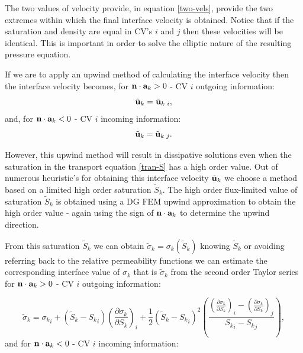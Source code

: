 The two values of velocity provide, in equation \ref{two-vels}, provide the two extremes within which the final interface 
velocity is obtained. Notice that if the saturation and density are equal in 
CV's $i$ and $j$ then these velocities will be identical. This is important in order to 
solve the elliptic nature of the resulting pressure equation. 

If we are to apply an upwind method of calculating the interface velocity then 
the interface velocity becomes, for ${\bf n}\cdot {\bf a}_k>0$ - CV $i$ outgoing information:
\begin{equation}
{\tilde{\bf u}}_k = {\tilde{\bf u}}_k\:_i ,
\end{equation} 
and, for ${\bf n}\cdot {\bf a}_k<0$ - CV $i$ incoming information:
\begin{equation}
{\tilde{\bf u}}_k = {\tilde{\bf u}}_k\:_j. 
\end{equation} 

However, this upwind method will result in dissipative solutions even when the saturation in the transport equation \ref{tran-S}
has a high order value. 
Out of numerous heuristic's for obtaining this interface velocity ${\tilde{\bf u}}_k$ we choose 
a method based on a limited high order saturation $\tilde S_k$.  
The high order flux-limited value of saturation $\tilde S_k$ is obtained using a DG FEM upwind approximation to 
obtain the high order value - again using the 
sign of ${\bf n}\cdot {\bf a}_k$ to determine the upwind direction. 

From this saturation $\tilde S_k$ we can obtain 
$\tilde\sigma_k = \sigma_k (\tilde S_k)$ knowing $\tilde S_k$ or avoiding referring back to the relative 
permeability functions 
we can estimate the corresponding interface value of $\sigma_k$ that is 
$\tilde\sigma_k$ from the second order Taylor series for ${\bf n}\cdot {\bf a}_k>0$ - CV $i$ outgoing information: 

\begin{equation}
\tilde\sigma_k =   {\sigma_k}_i + (\tilde S_k - {S_k}_i) \left(\frac{\partial\sigma_k}{\partial S_k}\right)_i 
+\frac{1}{2} (\tilde S_k - {S_k}_i)^2   
\left(  \frac{  \left(\frac{\partial\sigma_k}{\partial S_k}\right)_i - \left(\frac{\partial\sigma_k}{\partial S_k}\right)_j  }  
{{S_k}_i - {S_k}_j}  \right) , 
\label{sigma-out}
\end{equation} 
and for ${\bf n}\cdot {\bf a}_k<0$ - CV $i$ incoming information:


